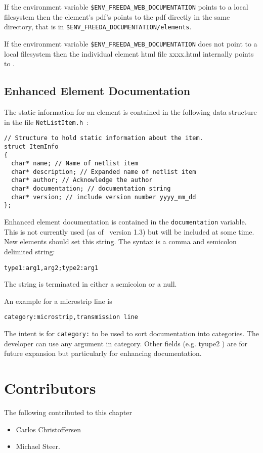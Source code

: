 If the environment variable {\tt \$ENV\_FREEDA\_WEB\_DOCUMENTATION} points to a local filesystem then the element's pdf's points to the pdf directly in the same directory, that is in
\newline
{\tt \$ENV\_FREEDA\_DOCUMENTATION/elements}.

If the environment variable {\tt \$ENV\_FREEDA\_WEB\_DOCUMENTATION} does not point to a local filesystem  then the individual element html file xxxx.html internally points to
.



\subsection{Enhanced Element Documentation}

The static information for an element is contained in the following data structure in the file
\newline
{\tt NetListItem.h }:

\begin{verbatim}
// Structure to hold static information about the item.
struct ItemInfo
{
  char* name; // Name of netlist item
  char* description; // Expanded name of netlist item
  char* author; // Acknowledge the author
  char* documentation; // documentation string
  char* version; // include version number yyyy_mm_dd
};
\end{verbatim}

Enhanced element documentation is contained in the {\tt documentation} variable.  This is not currently used (as of \FDA\ version 1.3) but will be included at some time. New elements should set this string.  The syntax is a comma and semicolon delimited string:

\indent
{\tt type1:arg1,arg2;type2:arg1}

The string is terminated in either a semicolon or a null.

An example for a microstrip line is

\indent
{\tt category:microstrip,transmission line}

The intent is for {\tt category:} to be used to sort documentation into categories. The developer can use any argument in category.  Other fields (e.g. tyupe2 ) are for future expansion but particularly for enhancing documentation.

\section{Contributors}
The following contributed to this chapter
\begin{itemize}
\item[] Carlos Christoffersen
\item[] Michael Steer.
\end{itemize}
